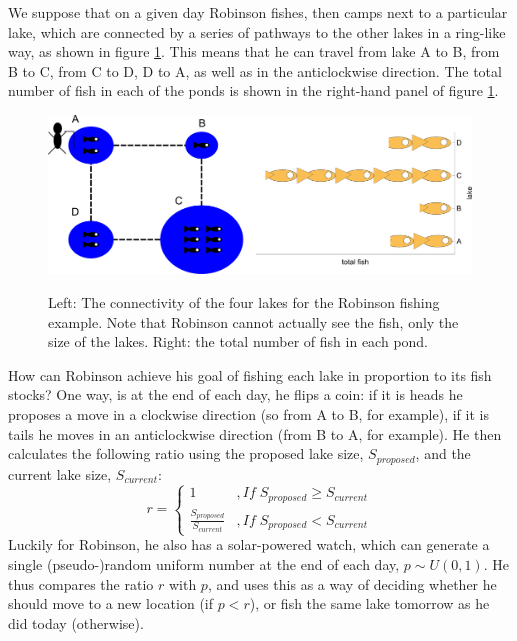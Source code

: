 \documentclass[11pt,fullpage]{book}
\begin{document}
We suppose that on a given day Robinson fishes, then camps next to a particular lake, which are connected by a series of pathways to the other lakes in a ring-like way, as shown in figure \ref{fig:metropolisHastings_fishInPonds}. This means that he can travel from lake A to B, from B to C, from C to D, D to A, as well as in the anticlockwise direction. The total number of fish in each of the ponds is shown in the right-hand panel of figure \ref{fig:metropolisHastings_fishInPonds}.

\begin{figure}
\centering
\scalebox{0.2} 
{\includegraphics{metropolisHastings_fishInPonds.pdf}}
\caption{Left: The connectivity of the four lakes for the Robinson fishing example. Note that Robinson cannot actually see the fish, only the size of the lakes. Right: the total number of fish in each pond.}\label{fig:metropolisHastings_fishInPonds}
\end{figure}


How can Robinson achieve his goal of fishing each lake in proportion to its fish stocks? One way, is at the end of each day, he flips a coin: if it is heads he proposes a move in a clockwise direction (so from A to B, for example), if it is tails he moves in an anticlockwise direction (from B to A, for example). He then calculates the following ratio using the proposed lake size, $S_{proposed}$, and the current lake size, $S_{current}$:
%
\begin{equation}
r =
\begin{cases}
1 & , If\; S_{proposed} \geq S_{current}\\
 \frac{S_{proposed}}{S_{current}}& , If\; S_{proposed} < S_{current}
\end{cases}
\end{equation}
%
Luckily for Robinson, he also has a solar-powered watch, which can generate a single (pseudo-)random uniform number at the end of each day, $p\sim U(0,1)$. He thus compares the ratio $r$ with $p$, and uses this as a way of deciding whether he should move to a new location (if $p<r$), or fish the same lake tomorrow as he did today (otherwise).
\end{document}
